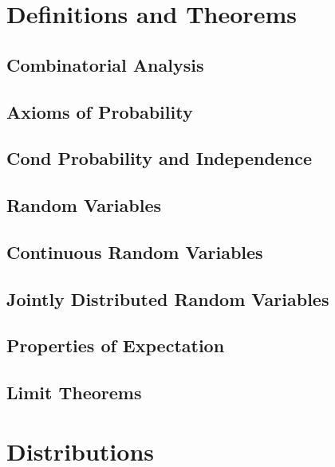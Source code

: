 \documentclass[10pt]{article}
\begin{document}
\begin{multicols*}{3}
\section{Definitions and Theorems}
\subsection{Combinatorial Analysis}


\subsection{Axioms of Probability}


\subsection{Cond Probability and Independence}


\subsection{Random Variables}


\subsection{Continuous Random Variables}


\subsection{Jointly Distributed Random Variables}


\subsection{Properties of Expectation}


\subsection{Limit Theorems}


\section{Distributions}


\end{multicols*}
\end{document}
